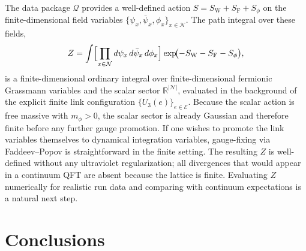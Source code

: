 \documentclass[11pt]{article}
\theoremstyle{remark}
\newcommand{\R}{\mathbb R}
\newcommand{\mcN}{\mathcal N}
\newcommand{\mcE}{\mathcal E}
\begin{document}
The data package $\mathcal Q$ provides a well-defined action
$S=S_{\mathrm W}+S_{\mathrm F}+S_\phi$
on the finite-dimensional field variables
$\{\psi_x,\bar\psi_x,\phi_x\}_{x\in\mcN}$.
The path integral over these fields,
\[
Z=\int \Bigl[\prod_{x\in\mcN}d\psi_x\,d\bar\psi_x\,d\phi_x\Bigr]
\exp\!\bigl(-S_{\mathrm W}-S_{\mathrm F}-S_\phi\bigr),
\]
is a finite-dimensional ordinary integral over finite-dimensional fermionic
Grassmann variables and the scalar sector $\R^{|\mcN|}$, evaluated in the
background of the explicit finite link configuration $\{U_3(e)\}_{e\in\mcE}$.
Because the scalar action is free massive with $m_\phi>0$, the scalar sector is
already Gaussian and therefore finite before any further gauge promotion.
If one wishes to promote the link variables themselves to dynamical integration
variables, gauge-fixing via Faddeev--Popov is straightforward in the finite
setting.
The resulting $Z$ is well-defined without any ultraviolet regularization;
all divergences that would appear in a continuum QFT are absent because the
lattice is finite.
Evaluating $Z$ numerically for realistic run data and comparing with continuum
expectations is a natural next step.

\section{Conclusions}
\label{sec:conclusions}
\end{document}
